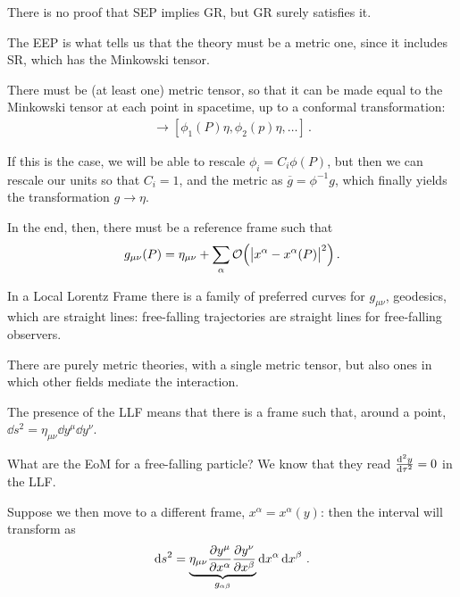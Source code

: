 \documentclass[main.tex]{subfiles}
\begin{document}
There is no proof that SEP implies GR, but GR surely satisfies it.

The EEP is what tells us that the theory must be a metric one, since it includes SR, which has the Minkowski tensor. 

There must be (at least one) metric tensor, so that it can be made equal to the Minkowski tensor at each point in spacetime, up to a conformal transformation: 
%
\begin{align}
[g_1, g_2 \dots ] \to [\phi_1 (P) \eta, \phi_2 (p) \eta,  \dots]
\,.
\end{align}

If this is the case, we will be able to rescale \(\phi _i = C_i \phi (P)\), but then we can rescale our units so that \(C_i = 1\), and the metric as \(\overline{g} = \phi^{-1} g\), which finally yields the transformation \(g \to \eta \). 

In the end, then, there must be a reference frame such that  
%
\begin{align}
 g_{\mu \nu } (P) = \eta_{\mu \nu } + \sum _{\alpha } \order{\abs{x^{\alpha } - x^{\alpha } (P)}^2}
\,.
\end{align}

In a Local Lorentz Frame there is a family of preferred curves for \(g_{\mu \nu }\), geodesics, which are straight lines: free-falling trajectories are straight lines for free-falling observers. 

There are purely metric theories, with a single metric tensor, but also ones in which other fields mediate the interaction. 

The presence of the LLF means that there is a frame such that, around a point, \(\dd{s^2} = \eta_{\mu \nu } \dd{y^{\mu }} \dd{y^{\nu }}\). 

What are the EoM for a free-falling particle? 
We know that they read \(\dv[2]{y}{\tau } = 0\) in the LLF. 

Suppose we then move to a different frame, \(x^{\alpha } = x^{\alpha } (y)\): then the interval will transform as 
%
\begin{align}
\dd{s^2} = \underbrace{\eta_{\mu \nu } 
\pdv{y^{\mu }}{x^{\alpha }}
\pdv{y^{\nu }}{x^{\beta   }}}_{g_{\alpha \beta }}
\dd{x^{\alpha }} \dd{x^{\beta }}
\,.
\end{align}
\end{document}
